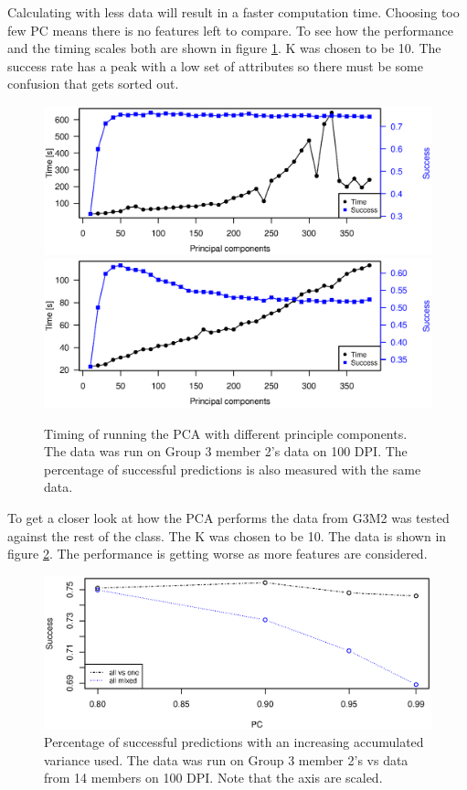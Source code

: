 Calculating with less data will result in a faster computation time.
Choosing too few PC means there is no features left to compare.
To see how the performance and the timing scales both are shown in figure \ref{fig:pca_timing}. K was chosen to be 10.
The success rate has a peak with a low set of attributes so there must be some confusion that gets sorted out. 

\begin{figure}[H]
\centering
\includegraphics[width =0.8 \textwidth]{graphics/pca_timing}
\includegraphics[width =0.8 \textwidth]{graphics/pca_timing_nikolaj}
\caption[Timing of PCA]{Timing of running the PCA with different principle components. 
The data was run on Group 3 member 2's data on 100 DPI. 
The percentage of successful predictions is also measured with the same data.}
\label{fig:pca_timing}
\end{figure}

To get a closer look at how the PCA performs the data from G3M2 was tested against the rest of the class. 
The K was chosen to be 10. 
The data is shown in figure \ref{fig:pca_success}.
The performance is getting worse as more features are considered.

\begin{figure}[H]
\centering
\includegraphics[width =0.95 \textwidth]{graphics/pca_success}
\caption[PCA performance]{Percentage of successful predictions with an increasing accumulated variance used.
The data was run on Group 3 member 2's vs data from 14 members on 100 DPI. Note that the axis are scaled.}
\label{fig:pca_success}
\end{figure}


